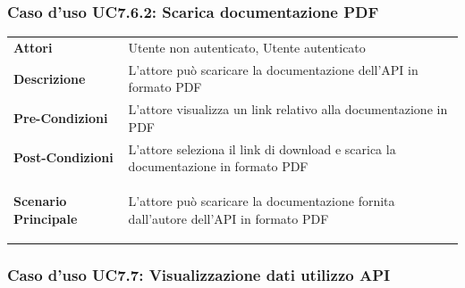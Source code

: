 \subsubsection{Caso d'uso UC7.6.2: Scarica documentazione PDF}
\label{UC7_6_2}

\begin{minipage}{\linewidth}
	\begin{tabular}{ l | p{11cm}}
		\hline
		\rowcolor{Gray}
		\multicolumn{2}{c}{UC7.6.2 - Scarica documentazione PDF} \\
		\hline
		\textbf{Attori} & Utente non autenticato, Utente autenticato \\
		\textbf{Descrizione} & L'attore può scaricare la documentazione dell'API in formato PDF\\
		\textbf{Pre-Condizioni} & L'attore visualizza un link relativo alla documentazione in PDF\\
		\textbf{Post-Condizioni} & L'attore seleziona il link di download e scarica la documentazione in formato PDF \\
		\textbf{Scenario Principale} & 
		\begin{enumerate*}[label=(\arabic*.),itemjoin={\newline}]
			\item L'attore può scaricare la documentazione fornita dall'autore dell'API in formato PDF
		\end{enumerate*}\\
	\end{tabular}
\end{minipage}

\subsubsection{Caso d'uso UC7.7: Visualizzazione dati utilizzo API}
\label{UC7_7}


